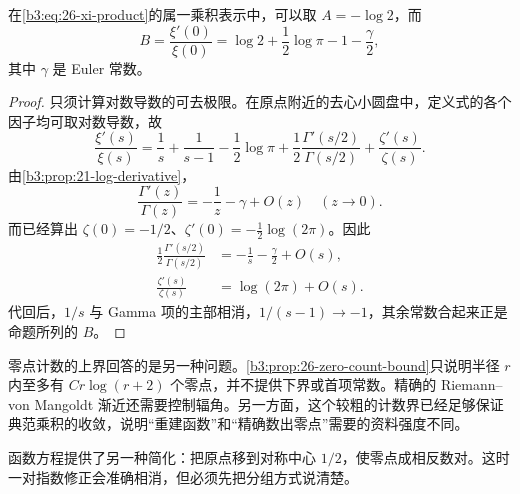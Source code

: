 \begin{proposition}[乘积的规范化常数]\label{b3:prop:26-xi-product-constants}
在\eqref{b3:eq:26-xi-product}的属一乘积表示中，可以取 \(A=-\log2\)，而
\[
 B=\frac{\xi'(0)}{\xi(0)}
   =\log2+\frac12\log\pi-1-\frac\gamma2,
\]
其中 \(\gamma\) 是 Euler 常数。
\end{proposition}
\begin{proof}
只须计算对数导数的可去极限。在原点附近的去心小圆盘中，定义式的各个因子均可取对数导数，故
\begin{equation}\label{b3:eq:26-xi-log-derivative-factors}
 \frac{\xi'(s)}{\xi(s)}
 =\frac1s+\frac1{s-1}-\frac12\log\pi
     +\frac12\frac{\Gamma'(s/2)}{\Gamma(s/2)}
     +\frac{\zeta'(s)}{\zeta(s)}.
\end{equation}
由\cref{b3:prop:21-log-derivative}，
\[
 \frac{\Gamma'(z)}{\Gamma(z)}=-\frac1z-\gamma+O(z)
                         \quad(z\to0).
\]
而已经算出 \(\zeta(0)=-1/2\)、\(\zeta'(0)=-\tfrac12\log(2\pi)\)。因此
\[
 \begin{aligned}
 \frac12\frac{\Gamma'(s/2)}{\Gamma(s/2)}
       &=-\frac1s-\frac\gamma2+O(s),\\
 \frac{\zeta'(s)}{\zeta(s)}&=\log(2\pi)+O(s).
 \end{aligned}
\]
代回后，\(1/s\) 与 Gamma 项的主部相消，\(1/(s-1)\to-1\)，其余常数合起来正是命题所列的 \(B\)。
\end{proof}

零点计数的上界回答的是另一种问题。\cref{b3:prop:26-zero-count-bound}只说明半径 \(r\) 内至多有 \(Cr\log(r+2)\) 个零点，并不提供下界或首项常数。精确的 Riemann--von Mangoldt 渐近还需要控制辐角。另一方面，这个较粗的计数界已经足够保证典范乘积的收敛，说明“重建函数”和“精确数出零点”需要的资料强度不同。

\ProseParagraphBreak
函数方程提供了另一种简化：把原点移到对称中心 \(1/2\)，使零点成相反数对。这时一对指数修正会准确相消，但必须先把分组方式说清楚。

